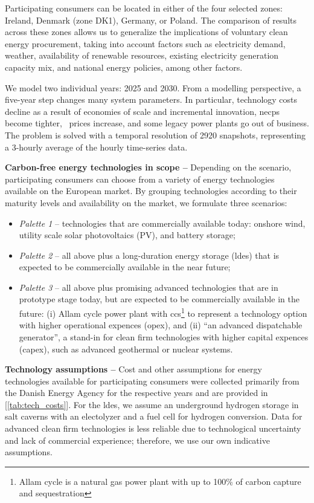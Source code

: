 \documentclass[11pt, 5p, nopreprintline]{elsarticle}
\newcommand{\co}{\ce{CO2}}
\begin{document}
Participating consumers can be located in either of the four selected zones: Ireland, Denmark (zone DK1), Germany, or Poland.
The comparison of results across these zones allows us to generalize the implications of voluntary clean energy procurement, taking into account factors such as electricity demand, weather, availability of renewable resources, existing electricity generation capacity mix, and national energy policies, among other factors.

We model two individual years: 2025 and 2030.
From a modelling perspective, a five-year step changes many system parameters.
In particular, technology costs decline as a result of economies of scale and incremental innovation, \gls{necp}s become tighter, \co~prices increase, and some legacy power plants go out of business.
The problem is solved with a temporal resolution of 2920 snapshots, representing a 3-hourly average of the hourly time-series data.

\textbf{Carbon-free energy technologies in scope --} Depending on the scenario, participating consumers can choose from a variety of energy technologies available on the European market. By grouping technologies according to their maturity levels and availability on the market, we formulate three scenarios:

\begin{itemize}[-]
    \item \textit{Palette 1} -- technologies that are commercially available today: onshore wind, utility scale solar photovoltaics (\gls{PV}), and battery storage;
    \item \textit{Palette 2} -- all above plus a long-duration energy storage (\gls{ldes}) that is expected to be commercially available in the near future;
    \item \textit{Palette 3} -- all above plus promising advanced technologies that are in prototype stage today, but are expected to be commercially available in the future: (i) Allam cycle power plant with \gls{ccs}\footnote{Allam cycle is a natural gas power plant with up to 100\% of carbon capture and sequestration} to represent a technology option with higher operational expences (\gls{opex}), and (ii) \enquote{an advanced dispatchable generator}, a stand-in for clean firm technologies with higher capital expences (\gls{capex}), such as advanced geothermal or nuclear systems.
\end{itemize}

\textbf{Technology assumptions --} Cost and other assumptions for energy technologies available for participating consumers were collected primarily from the Danish Energy Agency \cite{DEA-technologydata} for the respective years and are provided in [\cref{tab:tech_costs}].
For the \gls{ldes}, we assume an underground hydrogen storage in salt caverns with an electolyzer and a fuel cell for hydrogen conversion.
Data for advanced clean firm technologies is less reliable due to technological uncertainty and lack of commercial experience; therefore, we use our own indicative assumptions.
\end{document}
